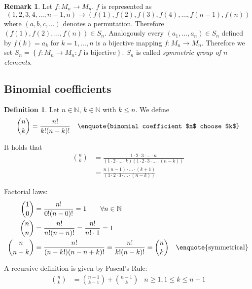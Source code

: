 \documentclass[a4paper,landscape,twocolumn]{article}
\theoremstyle{definition}
\newtheorem{defi}{Definition}
\newtheorem{rem}{Remark}
\newcommand\set[1]{\left\{#1\right\}}
\begin{document}

\begin{rem}
  Let $f: M_n \to M_n$. $f$ is represented as
  \[  (1, 2, 3, 4, \ldots, n-1, n) \to (f(1), f(2), f(3), f(4), \ldots, f(n-1), f(n))  \]
  where $(a, b, c, \ldots)$ denotes a permutation.
  Therefore $(f(1), f(2), \ldots, f(n)) \in S_n$. Analogously every $(a_1, \ldots, a_n) \in S_n$
  defined by $f(k) = a_k$ for $k=1,\ldots,n$ is a bijective mapping $f: M_n \to M_n$.
  Therefore we set $S_n = \set{f: M_n \to M_n: f \text{ is bijective}}$.
  $S_n$ is called \emph{symmetric group of $n$ elements}.
\end{rem}

\subsection{Binomial coefficients}
\begin{defi}
  Let $n \in \mathbb{N}$, $k \in \mathbb{N}$ with $k \leq n$.
  We define \begin{align*}
    \binom{n}{k} &= \frac{n!}{k! (n-k)!}   & \text{\enquote{binomial coefficient $n$ choose $k$}}
  \end{align*}
\end{defi}

It holds that
\begin{align*}
  \binom{n}{k} &= \frac{1\cdot 2\cdot 3\cdot \ldots \cdot n}{(1 \cdot 2 \cdot \ldots \cdot k) (1 \cdot 2 \cdot 3 \cdot \ldots \cdot (n-k))} \\
               &= \frac{n (n-1) \cdot \ldots \cdot (k+1)}{(1 \cdot 2 \cdot 3 \cdot \ldots \cdot (n-k))}
\end{align*}

Factorial laws:
\begin{align*}
  \binom 10 &= \frac{n!}{0! (n-0)!} = 1 \qquad \forall n \in \mathbb{N} \\
  \binom nn &= \frac{n!}{n! (n - n)!} = \frac{n!}{n! \cdot 1} = 1 \\
  \binom{n}{n-k} &= \frac{n!}{(n-k!)(n - n + k)!} = \frac{n!}{k! (n-k)!} = \binom nk & \text{\enquote{symmetrical}}
\end{align*}

A recursive definition is given by Pascal's Rule:
\begin{align*}
    \binom nk &= \binom{n-1}{k-1} + \binom{n-1}{k}
    & n \geq 1, 1 \leq k \leq n-1
\end{align*}
\end{document}
